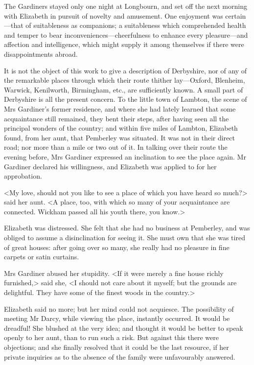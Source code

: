The Gardiners stayed only one night at Longbourn, and set off the next morning with Elizabeth in pursuit of novelty and amusement. One enjoyment was certain—that of suitableness as companions; a suitableness which comprehended health and temper to bear inconveniences—cheerfulness to enhance every pleasure—and affection and intelligence, which might supply it among themselves if there were disappointments abroad.

It is not the object of this work to give a description of Derbyshire, nor of any of the remarkable places through which their route thither lay—Oxford, Blenheim, Warwick, Kenilworth, Birmingham, etc., are sufficiently known. A small part of Derbyshire is all the present concern. To the little town of Lambton, the scene of Mrs Gardiner's former residence, and where she had lately learned that some acquaintance still remained, they bent their steps, after having seen all the principal wonders of the country; and within five miles of Lambton, Elizabeth found, from her aunt, that Pemberley was situated. It was not in their direct road; nor more than a mile or two out of it. In talking over their route the evening before, Mrs Gardiner expressed an inclination to see the place again. Mr Gardiner declared his willingness, and Elizabeth was applied to for her approbation.

<My love, should not you like to see a place of which you have heard so much?> said her aunt. <A place, too, with which so many of your acquaintance are connected. Wickham passed all his youth there, you know.>

Elizabeth was distressed. She felt that she had no business at Pemberley, and was obliged to assume a disinclination for seeing it. She must own that she was tired of great houses: after going over so many, she really had no pleasure in fine carpets or satin curtains.

Mrs Gardiner abused her stupidity. <If it were merely a fine house richly furnished,> said she, <I should not care about it myself; but the grounds are delightful. They have some of the finest woods in the country.>

Elizabeth said no more; but her mind could not acquiesce. The possibility of meeting Mr Darcy, while viewing the place, instantly occurred. It would be dreadful! She blushed at the very idea; and thought it would be better to speak openly to her aunt, than to run such a risk. But against this there were objections; and she finally resolved that it could be the last resource, if her private inquiries as to the absence of the family were unfavourably answered.

